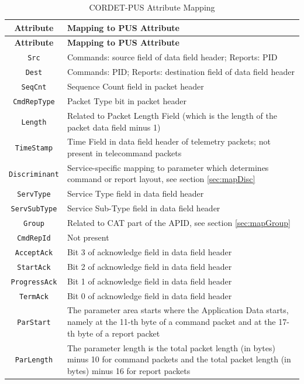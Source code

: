 \documentclass[a4paper,10pt]{article}
\begin{document}
\begin{longtable}{|c|>{\raggedright\arraybackslash}p{11cm}|}
\caption{CORDET-PUS Attribute Mapping}\label{tab:pcktAttPus} \\
\hline
\rowcolor{light-gray}
\textbf{Attribute} & \textbf{Mapping to PUS Attribute} \\
\hline\hline
\endfirsthead
\rowcolor{light-gray}
\textbf{Attribute} & \textbf{Mapping to PUS Attribute} \\
\hline\hline
\endhead
\texttt{Src} & Commands: source field of data field header; Reports: PID \\
\hline
\texttt{Dest} & Commands: PID; Reports: destination field of data field header \\
\hline
\texttt{SeqCnt} & Sequence Count field in packet header \\
\hline
\texttt{CmdRepType} & Packet Type bit in packet header \\
\hline
\texttt{Length} & Related to Packet Length Field (which is the length of the packet data field minus 1) \\
\hline
\texttt{TimeStamp} & Time Field in data field header of telemetry packets; not present in telecommand packets \\
\hline
\texttt{Discriminant} & Service-specific mapping to parameter which determines command or report layout, see section \ref{sec:mapDisc} \\
\hline
\texttt{ServType} & Service Type field in data field header \\
\hline
\texttt{ServSubType} & Service Sub-Type field in data field header \\
\hline
\texttt{Group} & Related to CAT part of the APID, see section \ref{sec:mapGroup} \\
\hline
\texttt{CmdRepId} & Not present \\
\hline
\texttt{AcceptAck} & Bit 3 of acknowledge field in data field header \\
\hline
\texttt{StartAck} & Bit 2 of acknowledge field in data field header \\
\hline
\texttt{ProgressAck} & Bit 1 of acknowledge field in data field header \\
\hline
\texttt{TermAck} & Bit 0 of acknowledge field in data field header \\
\hline
\texttt{ParStart} & The parameter area starts where the Application Data starts, namely at the 11-th byte of a command packet and at the 17-th byte of a report packet \\
\hline
\texttt{ParLength} & The parameter length is the total packet length (in bytes) minus 10 for command packets and the total packet length (in bytes) minus 16 for report packets \\
\hline
\end{longtable}  
\end{document}
